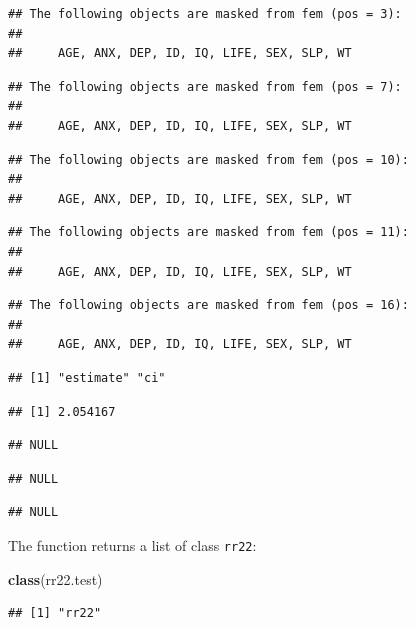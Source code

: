 \documentclass[12pt,]{book}
\newenvironment{Shaded}{\begin{snugshade}}{\end{snugshade}}
\newcommand{\KeywordTok}[1]{\textcolor[rgb]{0.13,0.29,0.53}{\textbf{#1}}}
\newcommand{\NormalTok}[1]{#1}
\theoremstyle{definition}
\theoremstyle{definition}
\theoremstyle{definition}
\theoremstyle{remark}
\begin{document}
\begin{verbatim}
## The following objects are masked from fem (pos = 3):
## 
##     AGE, ANX, DEP, ID, IQ, LIFE, SEX, SLP, WT
\end{verbatim}

\begin{verbatim}
## The following objects are masked from fem (pos = 7):
## 
##     AGE, ANX, DEP, ID, IQ, LIFE, SEX, SLP, WT
\end{verbatim}

\begin{verbatim}
## The following objects are masked from fem (pos = 10):
## 
##     AGE, ANX, DEP, ID, IQ, LIFE, SEX, SLP, WT
\end{verbatim}

\begin{verbatim}
## The following objects are masked from fem (pos = 11):
## 
##     AGE, ANX, DEP, ID, IQ, LIFE, SEX, SLP, WT
\end{verbatim}

\begin{verbatim}
## The following objects are masked from fem (pos = 16):
## 
##     AGE, ANX, DEP, ID, IQ, LIFE, SEX, SLP, WT
\end{verbatim}

\begin{verbatim}
## [1] "estimate" "ci"
\end{verbatim}

\begin{verbatim}
## [1] 2.054167
\end{verbatim}

\begin{verbatim}
## NULL
\end{verbatim}

\begin{verbatim}
## NULL
\end{verbatim}

\begin{verbatim}
## NULL
\end{verbatim}

The function returns a list of class \texttt{rr22}:

\begin{Shaded}
\begin{Highlighting}[]
\KeywordTok{class}\NormalTok{(rr22.test)}
\end{Highlighting}
\end{Shaded}

\begin{verbatim}
## [1] "rr22"
\end{verbatim}
\end{document}
